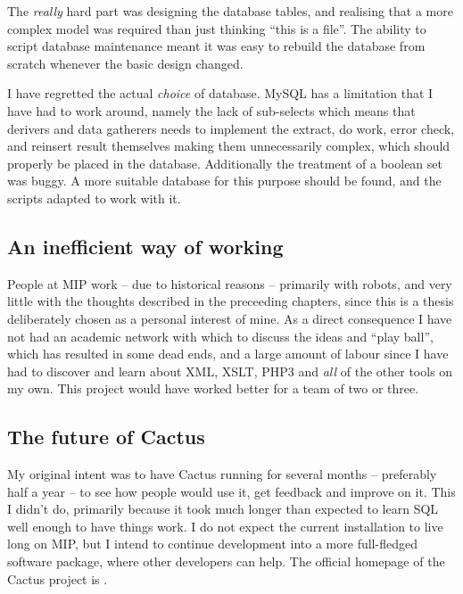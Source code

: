 The \textit{really} hard part was designing the database tables, and
realising that a more complex model was required than just thinking
``this is a file''.  The ability to script database maintenance
meant it was easy to rebuild the database from scratch whenever the
basic design changed.  

I have regretted the actual \textit{choice} of database.  MySQL has a
limitation that I have had to work around, namely the lack of
sub-selects which means that derivers and data gatherers needs to
implement the extract, do work, error check, and reinsert result
themselves making them unnecessarily complex, which should properly be
placed in the database.  Additionally the treatment of a boolean set
was buggy. A more suitable database for this purpose should be found,
and the scripts adapted to work with it.

\subsection*{An inefficient way of working}

People at MIP work -- due to historical reasons -- primarily with
robots, and very little with the thoughts described in the preceeding
chapters, since this is a thesis deliberately chosen as a personal
interest of mine.  As a direct consequence I have not had an academic
network with which to discuss the ideas and ``play ball'', which has
resulted in some dead ends, and a large amount of labour since I have
had to discover and learn about XML, XSLT, PHP3 and \textit{all} of
the other tools on my own.  This project would have worked better for
a team of two or three.




\subsection*{The future of Cactus}

My original intent was to have Cactus running for several months --
preferably half a year -- to see how people would use it, get feedback
and improve on it.  This I didn't do, primarily because it took much
longer than expected to learn SQL well enough to have things work.  I
do not expect the current installation to live long on MIP, but I
intend to continue development into a more full-fledged software
package, where other developers can help.  The official homepage of
the Cactus project is
.

